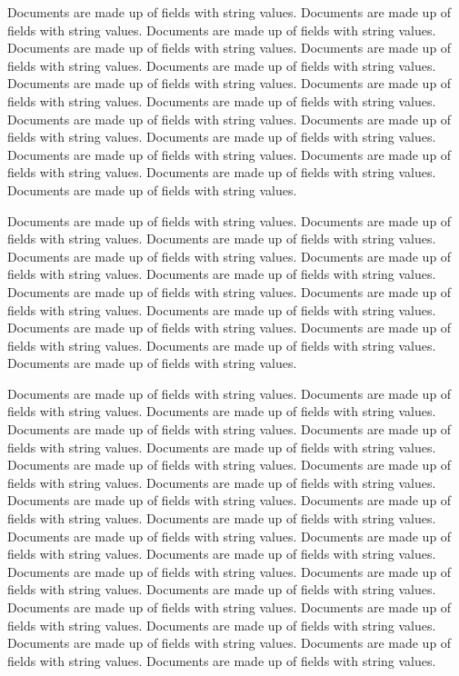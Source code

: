 \documentclass[10pt]{book}
\begin{document}
\noindent
Documents are made up of fields with string values.
Documents are made up of fields with string values.
Documents are made up of fields with string values.
Documents are made up of fields with string values.
Documents are made up of fields with string values.
Documents are made up of fields with string values.
Documents are made up of fields with string values.
Documents are made up of fields with string values.
Documents are made up of fields with string values.
Documents are made up of fields with string values.
Documents are made up of fields with string values.
Documents are made up of fields with string values.
Documents are made up of fields with string values.
Documents are made up of fields with string values.
Documents are made up of fields with string values.
Documents are made up of fields with string values.

Documents are made up of fields with string values.
Documents are made up of fields with string values.
Documents are made up of fields with string values.
Documents are made up of fields with string values.
Documents are made up of fields with string values.
Documents are made up of fields with string values.
Documents are made up of fields with string values.
Documents are made up of fields with string values.
Documents are made up of fields with string values.
Documents are made up of fields with string values.
Documents are made up of fields with string values.
Documents are made up of fields with string values.
Documents are made up of fields with string values.


Documents are made up of fields with string values.
Documents are made up of fields with string values.
Documents are made up of fields with string values.
Documents are made up of fields with string values.
Documents are made up of fields with string values.
Documents are made up of fields with string values.
Documents are made up of fields with string values.
Documents are made up of fields with string values.
Documents are made up of fields with string values.
Documents are made up of fields with string values.
Documents are made up of fields with string values.
Documents are made up of fields with string values.
Documents are made up of fields with string values.
Documents are made up of fields with string values.
Documents are made up of fields with string values.
Documents are made up of fields with string values.
Documents are made up of fields with string values.
Documents are made up of fields with string values.
Documents are made up of fields with string values.
Documents are made up of fields with string values.
Documents are made up of fields with string values.
Documents are made up of fields with string values.
Documents are made up of fields with string values.
Documents are made up of fields with string values.
\end{document}
